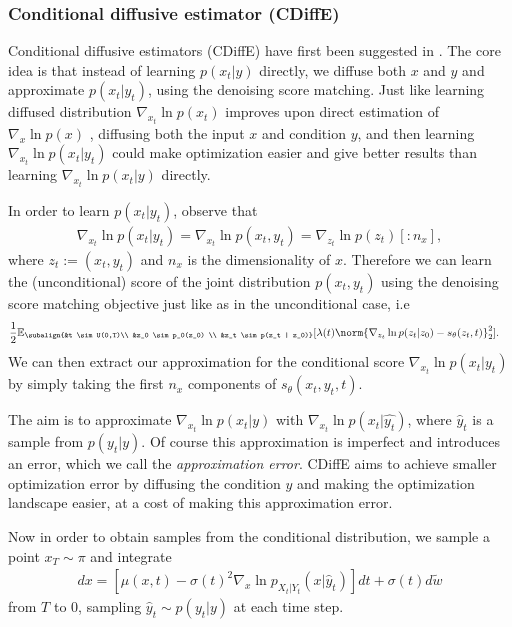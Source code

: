 \subsubsection{Conditional diffusive estimator (CDiffE)}
\label{ch2:sec:CDiffE}
Conditional diffusive estimators (CDiffE) have first been suggested in \cite{song2021sde}. The core idea is that instead of learning $p(x_t | y)$ directly, we diffuse both $x$ and $y$ and approximate $p(x_t | y_t)$, using the denoising score matching. Just like learning diffused distribution $\nabla_{x_t} \ln p(x_t)$ improves upon direct estimation of $\nabla_{x} \ln p(x)$ \cite{song2020generative_score, song2021sde}, diffusing both the input $x$ and condition $y$, and then learning $\nabla_{x_t} \ln p(x_t | y_t)$ could make optimization easier and give better results than learning  $\nabla_{x_t} \ln p(x_t | y)$ directly.
    
In order to learn $p(x_t | y_t)$, observe that
\begin{gather*}
    \nabla_{x_t}\ln p(x_t | y_t) = \nabla_{x_t}\ln p(x_t, y_t) = \nabla_{z_t}\ln p(z_t)[:n_x],
\end{gather*}
where $z_t := (x_t, y_t)$ and $n_x$ is the dimensionality of $x$. Therefore we can learn the (unconditional) score of the joint distribution $p(x_t, y_t)$ using the denoising score matching objective just like as in the unconditional case, i.e
\begin{gather}
    \label{ch2:CDF}
\begin{aligned}
    &\frac{1}{2} \mathbb{E}_{\subalign{&t \sim U(0,T)\\ &z_0 \sim p_0(z_0) \\ &z_t \sim p(z_t | z_0)}} [\lambda(t) \norm{\nabla_{z_t} \ln{p(z_t |z_0)} - s_\theta(z_t,t)}_2^2].
\end{aligned}
\end{gather}
We can then extract our approximation for the conditional score $\nabla_{x_t} \ln p(x_t|y_t)$ by simply taking the first $n_x$ components of $s_\theta(x_t, y_t,t)$.

The aim is to approximate $\nabla_{x_t} \ln p(x_t | y)$ with $\nabla_{x_t} \ln p(x_t|\hat{y_t})$, where $\hat{y}_t$ is a sample from $p(y_t | y)$. Of course this approximation is imperfect and introduces an error, which we call the \textit{approximation error}. CDiffE aims to achieve smaller optimization error by diffusing the condition $y$ and making the optimization landscape easier, at a cost of making this approximation error.

Now in order to obtain samples from the conditional distribution, we sample a point $x_T \sim \pi$ and integrate
\begin{gather*}
    dx = [\mu(x,t) - \sigma(t)^2 \nabla_{x} \ln p_{X_t|Y_t}(x | \hat{y}_t)]dt + \sigma(t)d\tilde{w}
\end{gather*}
from $T$ to $0$, sampling $\hat{y}_t \sim p(y_t | y)$ at each time step.

